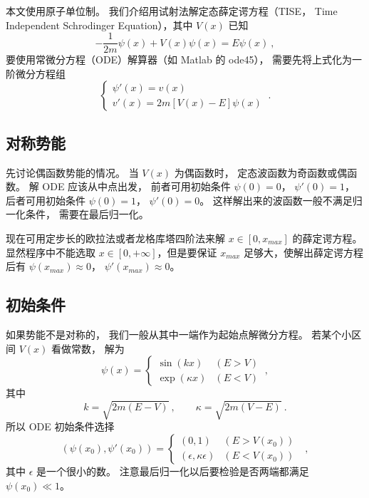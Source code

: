 


本文使用原子单位制。 我们介绍用试射法解定态薛定谔方程（TISE， Time Independent Schrodinger Equation），其中 $V(x)$ 已知
\begin{equation}
-\frac{1}{2m}\psi(x) + V(x)\psi(x) = E \psi(x)~,
\end{equation}
要使用常微分方程（ODE）解算器（如 Matlab 的 ode45）， 需要先将上式化为一阶微分方程组
\begin{equation}
\begin{cases}
\psi'(x) = v(x)\\
v'(x) = 2m[V(x) - E]\psi(x)
\end{cases}~.
\end{equation}

\subsection{对称势能}
先讨论偶函数势能的情况。 当 $V(x)$ 为偶函数时， 定态波函数为奇函数或偶函数。 解 ODE 应该从中点出发， 前者可用初始条件 $\psi(0)=0$， $\psi'(0)=1$， 后者可用初始条件 $\psi(0)=1$， $\psi'(0)=0$。 这样解出来的波函数一般不满足归一化条件， 需要在最后归一化。

现在可用定步长的欧拉法或者龙格库塔四阶法来解 $x\in [0, x_{max}]$ 的薛定谔方程。 显然程序中不能选取 $x\in [0,+\infty]$，但是要保证 $x_{max}$ 足够大，使解出薛定谔方程后有 $\psi(x_{max})\approx 0$， $\psi'(x_{max})\approx 0$。

\subsection{初始条件}
如果势能不是对称的， 我们一般从其中一端作为起始点解微分方程。 若某个小区间 $V(x)$ 看做常数， 解为
\begin{equation}
\psi(x) =
\begin{cases}
\sin(kx) &(E > V)\\
\exp(\kappa x) & (E < V)
\end{cases}~,
\end{equation}
其中
\begin{equation}
k = \sqrt{2m(E - V)}~, \qquad
\kappa = \sqrt{2m(V - E)}~.
\end{equation}
所以 ODE  初始条件选择
\begin{equation}
(\psi(x_0), \psi'(x_0)) =
\begin{cases}
(0, 1) &(E > V(x_0))\\
(\epsilon, \kappa\epsilon) & (E < V(x_0))
\end{cases}~~~,
\end{equation}
其中 $\epsilon$ 是一个很小的数。 注意最后归一化以后要检验是否两端都满足 $\psi(x_0) \ll 1$。

